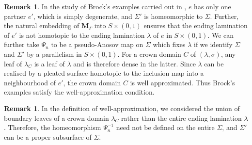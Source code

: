 \documentclass{amsart}
\theoremstyle{definition}
\newtheorem{rmk}[theorem]{Remark}
\newcommand\HHH{{\mathbb H}}
\begin{document}
\begin{rmk}
\label{Brock's case}
In the study of Brock's examples \cite{brock-itn} carried out in \cite{mahan-series2}, $e$ has only one partner $e'$, which is simply degenerate, and $\Sigma'$ is homeomorphic to $\Sigma$.
Further, the natural
 embedding of $\mathbf M_\Gamma$ into $S \times (0,1)$
 ensures that the ending lamination of $e'$ is not homotopic to the ending lamination $\lambda$ of $e$ in $S \times (0,1)$. 
We can further take  $\Psi_n$ to be a pseudo-Anosov map on $\Sigma$ which fixes $\lambda$ if we identify $\Sigma$ and $\Sigma'$ by a parallelism in $S \times (0,1)$.
For a crown domain $C$ of $(\lambda, \sigma)$, any leaf of $\lambda_C$ is a leaf of $\lambda$ and is therefore   dense in the latter.
Since $\lambda$ can be realised by a pleated surface homotopic to the inclusion map into a neighbourhood of $e'$, the crown domain $C$ is well approximated.
Thus Brock's examples satisfy the well-approximation condition.
\end{rmk}

\begin{rmk}
\label{partial realisation}
In the definition of well-approximation, we considered the union of boundary leaves of a crown domain $\lambda_C$ rather than the entire ending lamination $\lambda$.
Therefore,  the homeomorphism $\Psi_n^{-1}$ need not be defined on the entire $\Sigma$, and $\Sigma'$ can be a proper subsurface of $\Sigma$.
\end{rmk}


\end{document}
